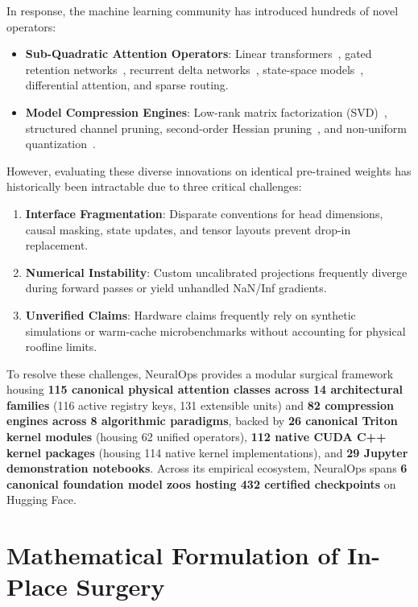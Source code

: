\documentclass{article}
\begin{document}
In response, the machine learning community has introduced hundreds of novel operators:
\begin{itemize}
    \item \textbf{Sub-Quadratic Attention Operators}: Linear transformers~\citep{katharopoulos2020transformers}, gated retention networks~\citep{sun2023retentive}, recurrent delta networks~\citep{schlag2021deltanet}, state-space models~\citep{gu2023mamba}, differential attention, and sparse routing.
    \item \textbf{Model Compression Engines}: Low-rank matrix factorization (SVD)~\citep{hu2022lora}, structured channel pruning, second-order Hessian pruning~\citep{frantar2023sparsegpt}, and non-uniform quantization~\citep{dettmers2022llmint8,frantar2023gptq}.
\end{itemize}

However, evaluating these diverse innovations on identical pre-trained weights has historically been intractable due to three critical challenges:
\begin{enumerate}
    \item \textbf{Interface Fragmentation}: Disparate conventions for head dimensions, causal masking, state updates, and tensor layouts prevent drop-in replacement.
    \item \textbf{Numerical Instability}: Custom uncalibrated projections frequently diverge during forward passes or yield unhandled NaN/Inf gradients.
    \item \textbf{Unverified Claims}: Hardware claims frequently rely on synthetic simulations or warm-cache microbenchmarks without accounting for physical roofline limits.
\end{enumerate}

To resolve these challenges, NeuralOps provides a modular surgical framework housing \textbf{115 canonical physical attention classes across 14 architectural families} (116 active registry keys, 131 extensible units) and \textbf{82 compression engines across 8 algorithmic paradigms}, backed by \textbf{26 canonical Triton kernel modules} (housing 62 unified operators), \textbf{112 native CUDA C++ kernel packages} (housing 114 native kernel implementations), and \textbf{29 Jupyter demonstration notebooks}. Across its empirical ecosystem, NeuralOps spans \textbf{6 canonical foundation model zoos hosting 432 certified checkpoints} on Hugging Face.

\section{Mathematical Formulation of In-Place Surgery}
\label{sec:math_formulation}
\end{document}
